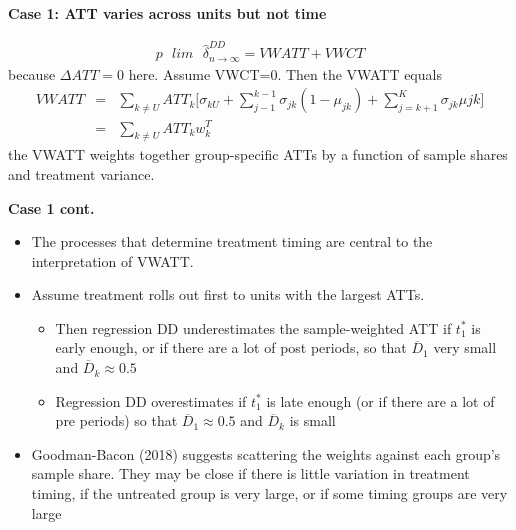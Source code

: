 \documentclass[notes=show]{beamer}
\begin{document}
\begin{frame}[plain]
\begin{center}
\textbf{Case 1: ATT varies across units but not time}
\end{center}

\begin{eqnarray*}
p\text{ }lim\text{ } \widehat{\delta}^{DD}_{n\to\infty} = VWATT + VWCT 
\end{eqnarray*}because $\Delta ATT=0$ here.  Assume VWCT=0. Then the VWATT equals
\begin{eqnarray*}
VWATT &=& \sum_{k\neq U} ATT_k \bigg [ \sigma_{kU} + \sum_{j-1}^{k-1} \sigma_{jk}(1 - \mu_{jk}) + \sum_{j=k+1}^K \sigma_{jk} \mu{jk} \bigg ] \\
&=& \sum_{k \neq U} ATT_k w_k^T
\end{eqnarray*}the VWATT weights together group-specific ATTs by a function of sample shares and treatment variance. 

\end{frame}

\begin{frame}[plain]
\begin{center}
\textbf{Case 1 cont.}
\end{center}

\begin{itemize}
\item The processes that determine treatment timing are central to the interpretation of VWATT.
\item Assume treatment rolls out first to units with the largest ATTs. 
	\begin{itemize}
	\item Then regression DD underestimates the sample-weighted ATT if $t^*_1$ is early enough, or if there are a lot of post periods, so that $\overline{D}_1$ very small and $\overline{D}_k \approx 0.5$
	\item Regression DD overestimates if $t_1^*$ is late enough (or if there are a lot of pre periods) so that $\overline{D}_1 \approx 0.5$ and $\overline{D}_k$ is small
	\end{itemize}
\item Goodman-Bacon (2018) suggests scattering the weights against each group's sample share. They may be close if there is little variation in treatment timing, if the untreated group is very large, or if some timing groups are very large
\end{itemize}

\end{frame}
\end{document}

